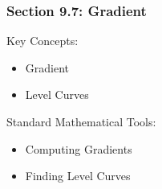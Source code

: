 %
% 

\begin{frame}
\frametitle{\Large {\color[rgb]{0.02,0.20,1.0} Section 9.7: Gradient}}
\scriptsize

\vspace{0.4cm}

\begin{block}{Key Concepts:}
\begin{itemize}
	\item[...] Gradient
	\item[...] Level Curves
\end{itemize}
\end{block}

\vspace{0.6cm}

\begin{block}{Standard Mathematical Tools:}
\begin{itemize}
	\item[...] Computing Gradients
	\item[...] Finding Level Curves
\end{itemize}
\end{block}

\vspace{2.0cm}
\end{frame}

